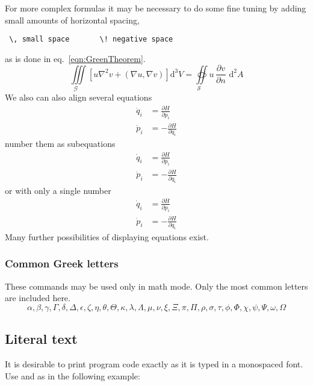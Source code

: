 For more complex formulas it may be necessary to do some fine tuning by adding small amounts of horizontal spacing, 
\begin{verbatim}
 \, small space       \! negative space
\end{verbatim}
as is done in eq.~\eqref{eqn:GreenTheorem}.
\begin{equation}
  \underset{\mathcal{G}\quad}\iiint\!
  \left[u\nabla^{2}v+\left(\nabla  u,\nabla  v\right)\right]\mathrm{d}^{3}V
  =\underset{\mathcal{S}\quad}\oiint  u\,\frac{\partial v}{\partial n}
  \,\,\mathrm{d}^{2}A
  \label{eqn:GreenTheorem}
\end{equation}
We also can also align several equations
\begin{align}
  \dot{q}_i & = \frac{\partial H}{\partial p_i} \\
  \dot{p}_i & = -\frac{\partial H}{\partial q_i} 
\end{align}
number them as subequations
\begin{subequations}
\begin{align}
  \dot{q}_i & = \frac{\partial H}{\partial p_i} \\
  \dot{p}_i & = -\frac{\partial H}{\partial q_i} 
\end{align}
\end{subequations}
or with only a single number
\begin{equation}
\begin{aligned}
  \dot{q}_i & = \frac{\partial H}{\partial p_i} \\
  \dot{p}_i & = -\frac{\partial H}{\partial q_i} 
\end{aligned}
\end{equation}
Many further possibilities of displaying equations exist. 

\subsubsection{Common Greek letters}
\label{sec:example:math:greekletters}
These commands may be used only in math mode. Only the most common
letters are included here.
%
\[\alpha, \beta, \gamma, \Gamma, \delta,\Delta,
\epsilon, \zeta, \eta, \theta, \Theta, \kappa,
\lambda, \Lambda, \mu, \nu, \xi, \Xi, \pi, \Pi,
\rho, \sigma, \tau, \phi, \Phi, \chi, \psi, \Psi,
\omega, \Omega\]

\subsection{Literal text}
\label{sec:example:verbatim}
%
It is desirable to print program code exactly as it is typed in a
monospaced font. Use  and
 as in the following example:

